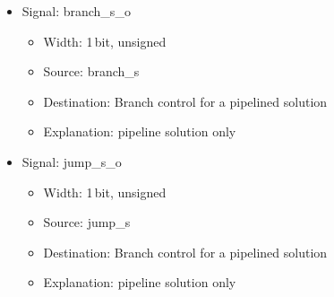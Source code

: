 \begin{itemize}
\begin{itemize}
\[\begin{array}{ll}
                                              01100 \Rightarrow & \mbox{ADDW, ADDIW} \\ 
                                              01101 \Rightarrow & \mbox{SRA, SRAI} \\ 
                                              01110 \Rightarrow & \mbox{SRL, SRLI} \\ 
                                              01111 \Rightarrow & \mbox{SLL, SLLI} \\ 
                                              10000 \Rightarrow & \mbox{BLT} \\ 
                                              10001 \Rightarrow & \mbox{BEQ} \\ 
                                              10010 \Rightarrow & \mbox{BGE} \\ 
                                              10011 \Rightarrow & \mbox{BNE} \\ 
                                              10100 \Rightarrow & \mbox{BLTU} \\ 
                                              10101 \Rightarrow & \mbox{BGEU}
                                              \end{array} \]
  \end{itemize}
  \item Signal: branch\_s\_o
  \begin{itemize}
    \item Width: 1\,bit, unsigned
    \item Source: branch\_s
    \item Destination: Branch control for a pipelined solution
    \item Explanation: pipeline solution only
  \end{itemize}
  \item Signal: jump\_s\_o
  \begin{itemize}
    \item Width: 1\,bit, unsigned
    \item Source: jump\_s
    \item Destination: Branch control for a pipelined solution
    \item Explanation: pipeline solution only
  \end{itemize}
  
\end{itemize}
